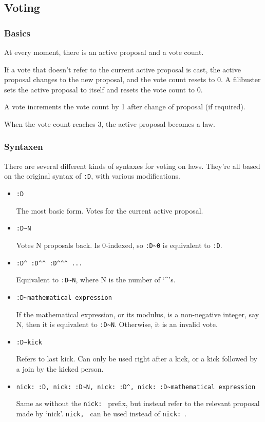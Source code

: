 \documentclass[11pt]{article}
\begin{document}
\subsection{Voting}

\subsubsection{Basics}

At every moment, there is an active proposal and a vote count.

If a vote that doesn't
refer to the current active proposal is cast, the active proposal changes to the new
proposal, and the vote count resets to 0. A filibuster sets the active proposal to itself and resets the vote count to 0.

A vote increments the vote count by 1 after change of proposal (if required).

When
the vote count reaches 3, the active proposal becomes a law.

\subsubsection{Syntaxen}
There are several different kinds of syntaxes for voting on laws. They're all based
on the original syntax of \texttt{:D}, with various modifications.

\begin{itemize}

\item \texttt{:D}

The most basic form. Votes for the current active proposal.

\item \texttt{:D\~{}N}

Votes N proposals back. Is 0-indexed, so \texttt{:D\~{}0} is
equivalent to \texttt{:D}.

\item \texttt{:D\^{} :D\^{}\^{} :D\^{}\^{}\^{} ...}

Equivalent to \texttt{:D\~{}N}, where N is the number of `\^{}'s.

\item \texttt{:D\~{}mathematical expression}

If the mathematical expression, or its
modulus, is a non-negative integer, say N, then it is equivalent to \texttt{:D\~{}N}.
Otherwise, it is an invalid vote.

\item \texttt{:D\~{}kick}

Refers to last kick. Can only be used right after a kick, or
a kick followed by a join by the kicked person.

\item \texttt{nick: :D, nick: :D\~{}N, nick: :D\^{}, nick: :D\~{}mathematical expression}

Same as without the \texttt{nick: } prefix, but instead refer to the relevant proposal made by `nick'. \texttt{nick, } can be used instead of \texttt{nick: }.

\end{itemize}
\end{document}
